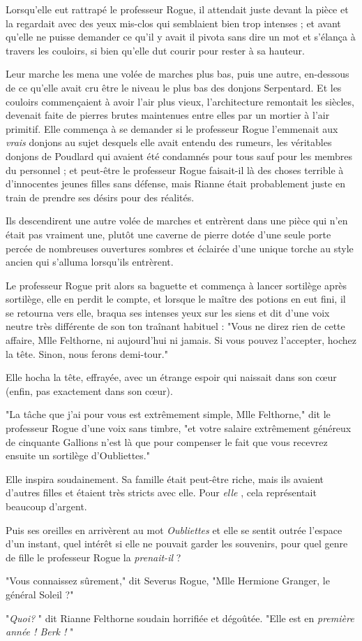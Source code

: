 Lorsqu'elle eut rattrapé le professeur Rogue, il attendait juste devant la pièce et la regardait avec des yeux mis-clos qui semblaient bien trop intenses ; et avant qu'elle ne puisse demander ce qu'il y avait il pivota sans dire un mot et s'élança à travers les couloirs, si bien qu'elle dut courir pour rester à sa hauteur.

Leur marche les mena une volée de marches plus bas, puis une autre, en-dessous de ce qu'elle avait cru être le niveau le plus bas des donjons Serpentard. Et les couloirs commençaient à avoir l'air plus vieux, l'architecture remontait les siècles, devenait faite de pierres brutes maintenues entre elles par un mortier à l'air primitif. Elle commença à se demander si le professeur Rogue l'emmenait aux \emph{vrais}  donjons au sujet desquels elle avait entendu des rumeurs, les véritables donjons de Poudlard qui avaient été condamnés pour tous sauf pour les membres du personnel ; et peut-être le professeur Rogue faisait-il là des choses terrible à d'innocentes jeunes filles sans défense, mais Rianne était probablement juste en train de prendre ses désirs pour des réalités.

Ils descendirent une autre volée de marches et entrèrent dans une pièce qui n'en était pas vraiment une, plutôt une caverne de pierre dotée d'une seule porte percée de nombreuses ouvertures sombres et éclairée d'une unique torche au style ancien qui s'alluma lorsqu'ils entrèrent.

Le professeur Rogue prit alors sa baguette et commença à lancer sortilège après sortilège, elle en perdit le compte, et lorsque le maître des potions en eut fini, il se retourna vers elle, braqua ses intenses yeux sur les siens et dit d'une voix neutre très différente de son ton traînant habituel : "Vous ne direz rien de cette affaire, Mlle Felthorne, ni aujourd'hui ni jamais. Si vous pouvez l'accepter, hochez la tête. Sinon, nous ferons demi-tour."

Elle hocha la tête, effrayée, avec un étrange espoir qui naissait dans son cœur (enfin, pas exactement dans son cœur).

"La tâche que j'ai pour vous est extrêmement simple, Mlle Felthorne," dit le professeur Rogue d'une voix sans timbre, "et votre salaire extrêmement généreux de cinquante Gallions n'est là que pour compenser le fait que vous recevrez ensuite un sortilège d'Oubliettes."

Elle inspira soudainement. Sa famille était peut-être riche, mais ils avaient d'autres filles et étaient très stricts avec elle. Pour \emph{elle} , cela représentait beaucoup d'argent.

Puis ses oreilles en arrivèrent au mot \emph{Oubliettes}  et elle se sentit outrée l'espace d'un instant, quel intérêt si elle ne pouvait garder les souvenirs, pour quel genre de fille le professeur Rogue la \emph{prenait-il}  ?

"Vous connaissez sûrement," dit Severus Rogue, "Mlle Hermione Granger, le général Soleil ?"

"\emph{Quoi?} " dit Rianne Felthorne soudain horrifiée et dégoûtée. "Elle est en \emph{première année ! Berk !} "

